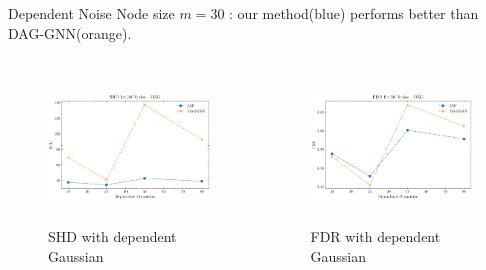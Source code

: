 \documentclass{beamer}
\begin{document}
\begin{frame}[allowframebreaks]{Dependent Noise}
    Node size $m=30$ : our method(blue) performs better than DAG-GNN(orange).
    \begin{columns}
        \begin{column}{0.5\textwidth}
            \begin{figure}
                \centering
                \includegraphics[height=4cm]{fig/SHD_dependence_30_DAG_threshold0.3.pdf}
                \caption{SHD with dependent Gaussian}
                \label{fig:dep_gaussian_shd_30}
            \end{figure}
        \end{column}
        \begin{column}{0.5\textwidth}
            \begin{figure}
                \centering
                \includegraphics[height=4cm]{fig/FDR_dependence_30_DAG_threshold0.3.pdf}
                \caption{FDR with dependent Gaussian}
                \label{fig:dep_gaussian_fdr_30}
            \end{figure}
        \end{column}
    \end{columns}


\end{frame}
\end{document}
